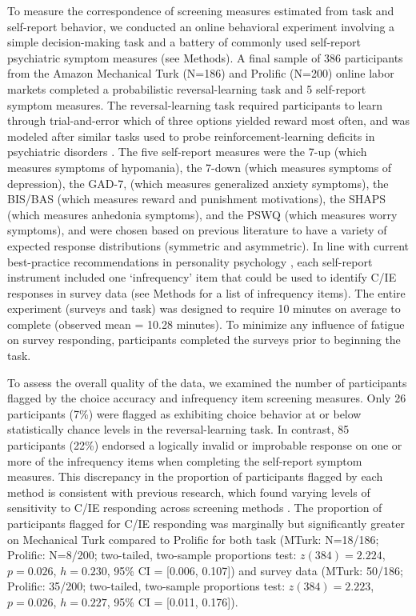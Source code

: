 \documentclass[a4paper,notitlepage,12pt]{article}
\begin{document}
\begin{refsection}[main]
To measure the correspondence of screening measures estimated from task and self-report behavior, we conducted an online behavioral experiment involving a simple decision-making task and a battery of commonly used self-report psychiatric symptom measures (see Methods). A final sample of 386 participants from the Amazon Mechanical Turk (N=186) and Prolific (N=200) online labor markets completed a probabilistic reversal-learning task and 5 self-report symptom measures. The reversal-learning task required participants to learn through trial-and-error which of three options yielded reward most often, and was modeled after similar tasks used to probe reinforcement-learning deficits in psychiatric disorders \cite{waltz2007probabilistic, mukherjee_reward_2020}. The five self-report measures were the 7-up (which measures symptoms of hypomania), the 7-down (which measures symptoms of depression), the GAD-7, (which measures generalized anxiety symptoms), the BIS/BAS (which measures reward and punishment motivations), the SHAPS (which measures anhedonia symptoms), and the PSWQ (which measures worry symptoms), and were chosen based on previous literature to have a variety of expected response distributions (symmetric and asymmetric). In line with current best-practice recommendations in personality psychology \cite{huang2015detecting}, each self-report instrument included one `infrequency' item that could be used to identify C/IE responses in survey data (see Methods for a list of infrequency items). The entire experiment (surveys and task) was designed to require 10 minutes on average to complete (observed mean = 10.28 minutes). To minimize any influence of fatigue on survey responding, participants completed the surveys prior to beginning the task.

To assess the overall quality of the data, we examined the number of participants flagged by the choice accuracy and infrequency item screening measures. Only 26 participants (7\%) were flagged as exhibiting choice behavior at or below statistically chance levels in the reversal-learning task. In contrast, 85 participants (22\%) endorsed a logically invalid or improbable response on one or more of the infrequency items when completing the self-report symptom measures. This discrepancy in the proportion of participants flagged by each method is consistent with previous research, which found varying levels of sensitivity to C/IE responding across screening methods \cite{desimone2018dirty}. The proportion of participants flagged for C/IE responding was marginally but significantly greater on Mechanical Turk compared to Prolific for both task (MTurk: N=18/186; Prolific: N=8/200; two-tailed, two-sample proportions test: $z(384)=2.224$, $p=0.026$, $h=0.230$, 95\% CI = [0.006, 0.107]) and survey data (MTurk: 50/186; Prolific: 35/200; two-tailed, two-sample proportions test: $z(384)=2.223$, $p=0.026$, $h=0.227$, 95\% CI = [0.011, 0.176]).


\end{refsection}
\end{document}
